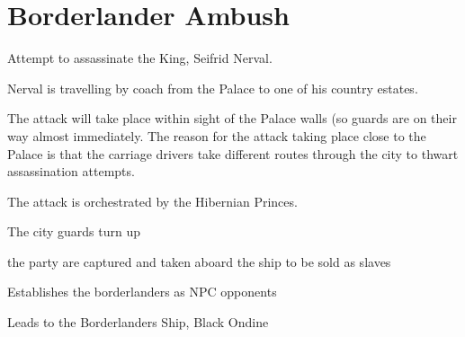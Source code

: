 \documentclass[a4paper]{dnd5}
\begin{document}
\section*{Borderlander Ambush}

\begin{precis}
\item Attempt to assassinate the King, Seifrid Nerval.
\item Nerval is travelling by coach from the Palace to one of his country estates.
\item The attack will take place within sight of the Palace walls (so guards are on their way almost immediately.  The reason for the attack taking place close to the Palace is that the carriage drivers take different routes through the city to thwart assassination attempts.  
\item The attack is orchestrated by the Hibernian Princes.
\end{precis}


\begin{outs} 
\item The city guards turn up
\item the party are captured and taken aboard the ship to be sold as slaves
\end{outs}

\begin{purpose}
\item Establishes the borderlanders as NPC opponents
\item Leads to the Borderlanders Ship, Black Ondine
\end{purpose}
     
\end{document}
